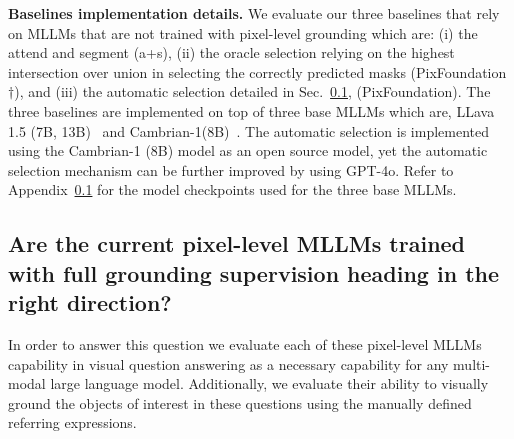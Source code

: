\textbf{Baselines implementation details.} We evaluate our three baselines that rely on MLLMs that are not trained with pixel-level grounding which are: (i) the attend and segment (a+s), (ii) the oracle selection relying on the highest intersection over union in selecting the correctly predicted masks (PixFoundation$\dagger$), and (iii) the automatic selection detailed in Sec.~\ref{}, (PixFoundation). The three baselines are implemented on top of three base MLLMs which are, LLava 1.5 (7B, 13B)~\cite{liu2024improved} and Cambrian-1(8B)~\cite{tong2024cambrian}. The automatic selection is implemented using the Cambrian-1 (8B) model as an open source model, yet the automatic selection mechanism can be further improved by using GPT-4o. Refer to Appendix~\ref{} for the model checkpoints used for the three base MLLMs.

\subsection{Are the current pixel-level MLLMs trained with full grounding supervision heading in the right direction?}
In order to answer this question we evaluate each of these pixel-level MLLMs capability in visual question answering as a necessary capability for any multi-modal large language model. Additionally, we evaluate their ability to visually ground the objects of interest in these questions using the manually defined referring expressions. 


